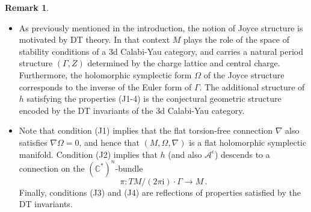 \documentclass{article}
\theoremstyle{definition}
\newtheorem{remark}[theorem]{Remark}
\numberwithin{equation}{section}
\begin{document}
\begin{remark}  \label{JoyceDefRem}
\begin{itemize}
    \item As previously mentioned in the introduction, the notion of Joyce structure is motivated by DT theory. In that context $M$ plays the role of the space of stability conditions of a 3d Calabi-Yau category, and carries a natural period structure $(\Gamma,Z)$ determined by the charge lattice and central charge. Furthermore, the holomorphic symplectic form $\Omega$ of the Joyce structure corresponds to the inverse of the Euler form of $\Gamma$. The additional structure of $h$ satisfying the properties (J1-4) is the conjectural geometric structure encoded by the DT invariants of the 3d Calabi-Yau category. 
    \item Note that condition (J1) implies that the flat torsion-free connection $\nabla$ also satisfies $\nabla \Omega =0$, and hence that $(M,\Omega,\nabla)$ is a flat holomorphic symplectic manifold. Condition (J2) implies that $h$ (and also $\mathcal{A}^{\epsilon}$) descends to a connection on the $(\mathbb{C}^*)^n$-bundle 
    \begin{equation*}
        \pi:TM/(2\pi \mathrm{i})\cdot \Gamma \to M\,.
    \end{equation*}
    Finally, conditions (J3) and (J4) are reflections of properties satisfied by the DT invariants. 
\end{itemize}  


\end{remark}
\end{document}
